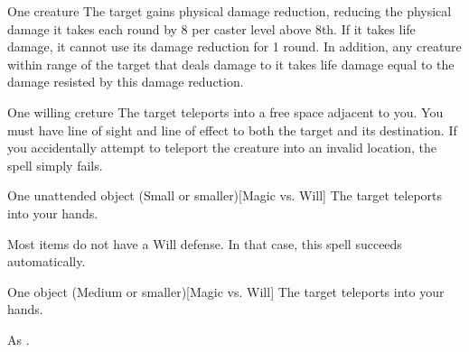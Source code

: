 \spellrng{\rngclose}
\spelldur{\durshort}
\begin{spelltarget}{One creature}
    \spelleffect The target gains physical damage reduction, reducing the physical damage it takes each round by 8  per caster level above 8th. If it takes life damage, it cannot use its damage reduction for 1 round. In addition, any creature within \rngmed range of the target that deals damage to it takes life damage equal to the damage resisted by this damage reduction.
\end{spelltarget}

\spellrng{\rngmed}
\begin{spelltarget}{One willing creture}
    \spelleffect The target teleports into a free space adjacent to you. You must have line of sight and line of effect to both the target and its destination. If you accidentally attempt to teleport the creature into an invalid location, the spell simply fails.
\end{spelltarget}

\spellrng{\rngclose}
\begin{spelltarget}{One unattended object (Small or smaller)}[Magic vs. Will]
    \spellsuccess The target teleports into your hands.
\end{spelltarget}
\spellnotes Most items do not have a Will defense. In that case, this spell succeeds automatically.

\spellrng{\rngmed}
\begin{spelltarget}{One object (Medium or smaller)}[Magic vs. Will]
    \spelleffect The target teleports into your hands.
\end{spelltarget}
\spellnotes As .

